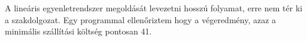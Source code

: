 A lineáris egyenletrendszer megoldását levezetni hosszú folyamat, erre nem tér ki a szakdolgozat. Egy programmal ellenőriztem hogy a végeredmény, azaz a minimális szállítási költség pontosan 41.
%




